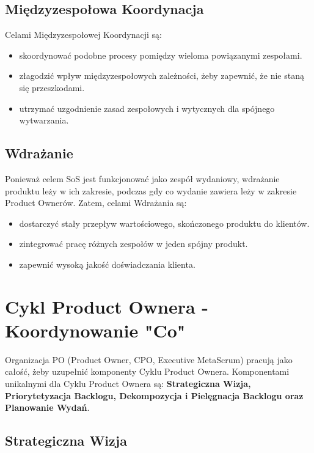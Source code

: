 \documentclass[12pt,a4paper,parskip=full]{scrartcl}
\begin{document}
\subsection{Międzyzespołowa Koordynacja}

Celami Międzyzespołowej Koordynacji są:

\begin{itemize}
	\item skoordynować podobne procesy pomiędzy wieloma powiązanymi zespołami.
	\item złagodzić wpływ międzyzespołowych zależności, żeby zapewnić, że nie staną się przeszkodami.
	\item utrzymać uzgodnienie zasad zespołowych i wytycznych dla spójnego wytwarzania.
\end{itemize}

\subsection{Wdrażanie}

Ponieważ celem SoS jest funkcjonować jako zespół wydaniowy, wdrażanie produktu leży w ich zakresie, podczas gdy co wydanie zawiera leży w zakresie Product Ownerów. Zatem, celami Wdrażania są:


\begin{itemize}
	\item dostarczyć stały przepływ wartościowego, skończonego produktu do klientów.
	\item zintegrować pracę różnych zespołów w jeden spójny produkt.
	\item zapewnić wysoką jakość doświadczania klienta.
\end{itemize}

\section{Cykl Product Ownera - Koordynowanie "Co"}

Organizacja PO (Product Owner, CPO, Executive MetaScrum) pracują jako całość, żeby uzupełnić komponenty Cyklu Product Ownera. Komponentami unikalnymi dla Cyklu Product Ownera są: \textbf{Strategiczna Wizja, Priorytetyzacja Backlogu, Dekompozycja i Pielęgnacja Backlogu oraz Planowanie Wydań}.

\subsection{Strategiczna Wizja}
\end{document}
